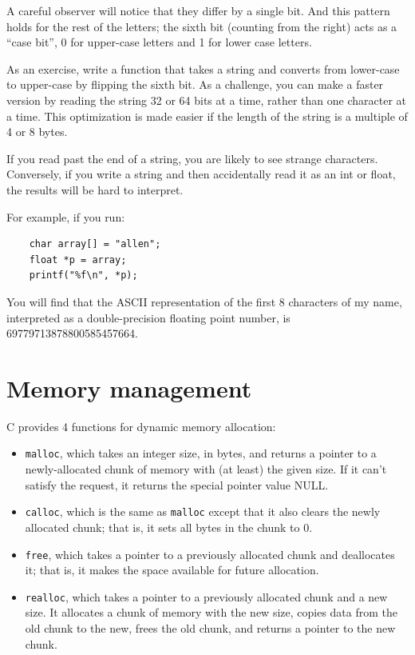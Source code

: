 \documentclass[12pt]{book}
\begin{document}
A careful observer will notice that they differ by a single
bit.  And this pattern holds for the rest of the letters; the
sixth bit (counting from the right) acts as a ``case bit'', 0 for
upper-case letters and 1 for lower case letters.

As an exercise, write a function that takes a string and converts
from lower-case to upper-case by flipping the sixth bit.  As a challenge,
you can make a faster version by reading the string 32 or 64 bits
at a time, rather than one character at a time.  This optimization
is made easier if the length of the string is a multiple of 4 or
8 bytes.

If you read past the end of a string, you are likely to see
strange characters.  Conversely, if you write a string and
then accidentally read it as an int or float, the results
will be hard to interpret.

For example, if you run:

\begin{verbatim}
    char array[] = "allen";
    float *p = array;
    printf("%f\n", *p);
\end{verbatim}

You will find that the ASCII representation of the first 8 characters
of my name, interpreted as a double-precision floating point number,
is 69779713878800585457664.



\chapter{Memory management}

C provides 4 functions for dynamic memory allocation:

\begin{itemize}

\item {\tt malloc}, which takes an integer size, in bytes, and returns
a pointer to a newly-allocated chunk of memory with (at least) the
given size.  If it can't satisfy the request, it returns
the special pointer value NULL.

\item {\tt calloc}, which is the same as {\tt malloc} except that
it also clears the newly allocated chunk; that
is, it sets all bytes in the chunk to 0.

\item {\tt free}, which takes a pointer to a previously allocated
chunk and deallocates it; that is, it makes the space available for
future allocation.

\item {\tt realloc}, which takes a pointer to a previously allocated
chunk and a new size.  It allocates a chunk of memory with the new
size, copies data from the old chunk to the new, frees the old chunk,
and returns a pointer to the new chunk.

\end{itemize}
\end{document}
